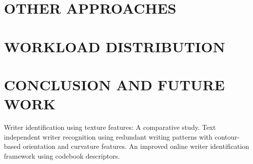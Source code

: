 \documentclass[letterpaper, 10 pt, conference]{ieeeconf}  %
\begin{document}

\section{OTHER APPROACHES}



\section{WORKLOAD DISTRIBUTION}



\section{CONCLUSION AND FUTURE WORK}



\begin{thebibliography}{99}
 Writer identification using texture features: A comparative study.
 Text independent writer recognition using redundant writing patterns with contour-based orientation and curvature features.
 An improved online writer identification framework using codebook descriptors.
\end{thebibliography}

\end{document}
